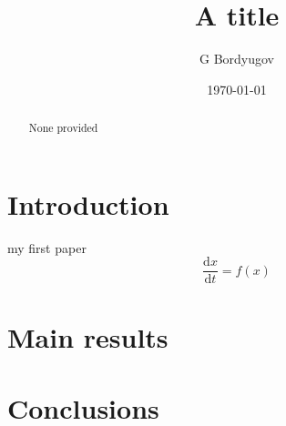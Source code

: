 \documentclass[a4paper]{article}
\title{A title}
\author{G Bordyugov \mailhref{gregbg@gmail.com}}
\date{\today}
\newcommand{\dd}{\text{d}}
\newcommand{\of}[1]{\left( {#1} \right)}
\newcommand{\fracd}[2]{\frac{\dd{}{#1}}{\dd{}{#2}}}
\begin{document}
\maketitle

\begin{abstract}
  None provided
\end{abstract}

\tableofcontents

\section{Introduction}
my first paper \cite{Anishchenko2000}
\[
\fracd{x}{t} = f\of{x}
\]

\section{Main results}
\section{Conclusions}



\end{document}
